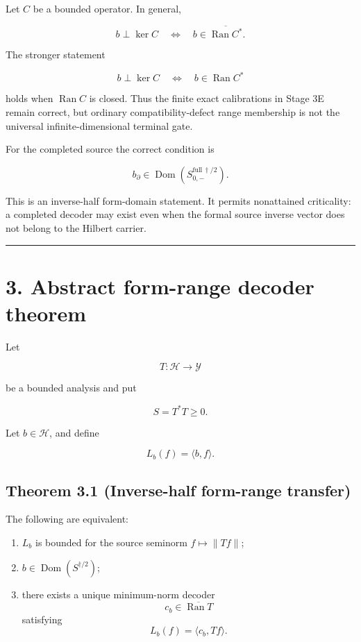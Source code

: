 Let \(C\) be a bounded operator. In general,

\[
b\perp\ker C
\quad\Longleftrightarrow\quad
b\in\overline{\operatorname{Ran}C^*}.
\]

The stronger statement

\[
b\perp\ker C
\quad\Longleftrightarrow\quad
b\in\operatorname{Ran}C^*
\]

holds when \(\operatorname{Ran}C\) is closed. Thus the finite exact
calibrations in Stage 3E remain correct, but ordinary compatibility-defect
range membership is not the universal infinite-dimensional terminal gate.

For the completed source the correct condition is

\[
\boxed{
b_\partial\in
\operatorname{Dom}\!\left(S_{0,-}^{\mathrm{full}\,\dagger/2}\right).
}
\tag{2.1}
\]

This is an inverse-half form-domain statement. It permits nonattained
criticality: a completed decoder may exist even when the formal source inverse
vector does not belong to the Hilbert carrier.

\begin{center}\rule{0.5\linewidth}{0.5pt}\end{center}

\hypertarget{abstract-form-range-decoder-theorem}{%
\section{3. Abstract form-range decoder theorem}\label{abstract-form-range-decoder-theorem}}

Let

\[
T:\mathcal H\longrightarrow\mathcal Y
\]

be a bounded analysis and put

\[
S=T^*T\ge0.
\]

Let \(b\in\mathcal H\), and define

\[
L_b(f)=\langle b,f\rangle.
\]

\hypertarget{theorem-3.1-inverse-half-form-range-transfer}{%
\subsection{Theorem 3.1 (Inverse-half form-range transfer)}\label{theorem-3.1-inverse-half-form-range-transfer}}

The following are equivalent:

\begin{enumerate}
\def\labelenumi{\arabic{enumi}.}
\tightlist
\item
  \(L_b\) is bounded for the source seminorm \(f\mapsto\|Tf\|\);
\item
  \(b\in\operatorname{Dom}(S^{\dagger/2})\);
\item
  there exists a unique minimum-norm decoder
  \[
  c_b\in\overline{\operatorname{Ran}T}
  \]
  satisfying
  \[
  L_b(f)=\langle c_b,Tf\rangle.
  \]
\end{enumerate}


